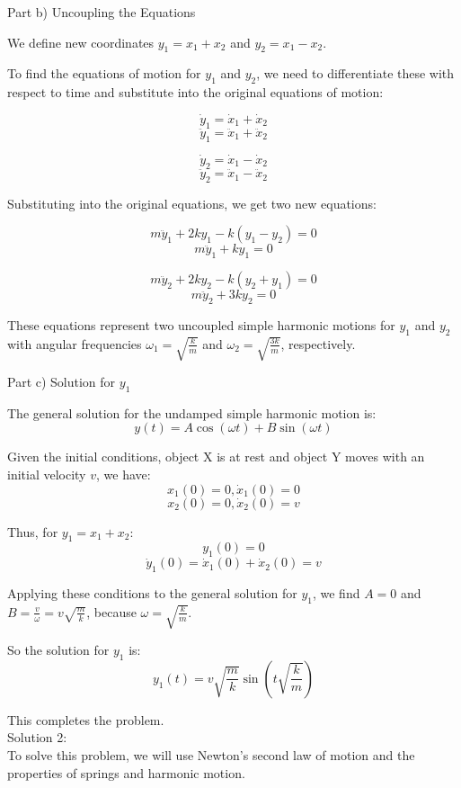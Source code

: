 \documentclass[a4paper,11pt]{article}
\begin{document}
Part b) Uncoupling the Equations

We define new coordinates \( y_{1} = x_{1} + x_{2} \) and \( y_{2} = x_{1} - x_{2} \).

To find the equations of motion for \( y_{1} \) and \( y_{2} \), we need to differentiate these with respect to time and substitute into the original equations of motion:

\[ \dot{y}_{1} = \dot{x}_{1} + \dot{x}_{2} \]
\[ \ddot{y}_{1} = \ddot{x}_{1} + \ddot{x}_{2} \]

\[ \dot{y}_{2} = \dot{x}_{1} - \dot{x}_{2} \]
\[ \ddot{y}_{2} = \ddot{x}_{1} - \ddot{x}_{2} \]

Substituting into the original equations, we get two new equations:

\[ m \ddot{y}_{1} + 2ky_{1} - k(y_{1} - y_{2}) = 0 \]
\[ m \ddot{y}_{1} + ky_{1} = 0 \]

\[ m \ddot{y}_{2} + 2ky_{2} - k(y_{2} + y_{1}) = 0 \]
\[ m \ddot{y}_{2} + 3ky_{2} = 0 \]

These equations represent two uncoupled simple harmonic motions for \( y_{1} \) and \( y_{2} \) with angular frequencies \( \omega_{1} = \sqrt{\frac{k}{m}} \) and \( \omega_{2} = \sqrt{\frac{3k}{m}} \), respectively.

Part c) Solution for \( y_{1} \)

The general solution for the undamped simple harmonic motion is:
\[ y(t) = A \cos(\omega t) + B \sin(\omega t) \]

Given the initial conditions, object X is at rest and object Y moves with an initial velocity \( v \), we have:
\[ x_{1}(0) = 0, \dot{x}_{1}(0) = 0 \]
\[ x_{2}(0) = 0, \dot{x}_{2}(0) = v \]

Thus, for \( y_{1} = x_{1} + x_{2} \):
\[ y_{1}(0) = 0 \]
\[ \dot{y}_{1}(0) = \dot{x}_{1}(0) + \dot{x}_{2}(0) = v \]

Applying these conditions to the general solution for \( y_{1} \), we find \( A = 0 \) and \( B = \frac{v}{\omega} = v \sqrt{\frac{m}{k}} \), because \( \omega = \sqrt{\frac{k}{m}} \).

So the solution for \( y_{1} \) is:
\[ y_{1}(t) = v \sqrt{\frac{m}{k}} \sin(t \sqrt{\frac{k}{m}}) \]

This completes the problem. \\ 

\noindent Solution 2: \\

To solve this problem, we will use Newton's second law of motion and the properties of springs and harmonic motion.
\end{document}
